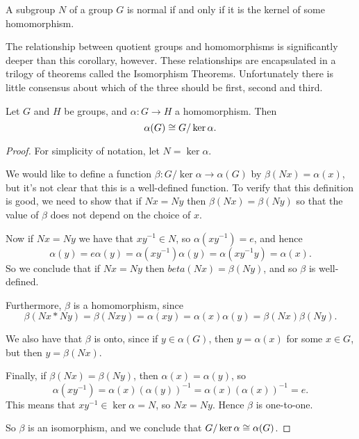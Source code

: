 \begin{corollary}
  A subgroup $N$ of a group $G$ is normal if and only if it is the 
  kernel of some homomorphism.
\end{corollary}

The relationship between quotient groups and homomorphisms is 
significantly deeper than this corollary, however.  These 
relationships are encapsulated in a trilogy of theorems called the 
Isomorphism Theorems.  Unfortunately there is little consensus about 
which of the three should be first, second and third.

\begin{theorem}
  Let $G$ and $H$ be groups, and $\alpha: G \to H$ a homomorphism.  
  Then
  \[
    \alpha(G) \cong G/\ker \alpha.
  \]
\end{theorem}
\begin{proof}
  For simplicity of notation, let $N = \ker \alpha$.
  
  We would like to define a function $\beta : G/\ker \alpha \to
  \alpha(G)$ by $\beta(Nx) = \alpha(x)$, but it's not clear that this 
  is a well-defined function.  To verify that this definition is 
  good, we need to show that if $Nx = Ny$ then $\beta(Nx) = 
  \beta(Ny)$ so that the value of $\beta$ does not depend on the choice 
  of $x$.
  
  Now if $Nx = Ny$ we have that $xy^{-1} \in N$, so $\alpha(xy^{-1}) = 
  e$, and hence
  \[
    \alpha(y) = e\alpha(y) = \alpha(xy^{-1})\alpha(y) = 
    \alpha(xy^{-1}y) = \alpha(x).
  \]
  So we conclude that if $Nx = Ny$ then $beta(Nx) = \beta(Ny)$, and 
  so $\beta$ is well-defined.
  
  Furthermore, $\beta$ is a homomorphism, since
  \[
    \beta(Nx \ast Ny) = \beta(Nxy) = \alpha(xy) = 
    \alpha(x)\alpha(y) = \beta(Nx)\beta(Ny).
  \]
  
  We also have that $\beta$ is onto, since if $y \in \alpha(G)$, then 
  $y = \alpha(x)$ for some $x \in G$, but then $y = \beta(Nx)$.
  
  Finally, if $\beta(Nx) = \beta(Ny)$, then $\alpha(x) = \alpha(y)$, so
  \[
    \alpha(xy^{-1}) = \alpha(x)(\alpha(y))^{-1} = 
    \alpha(x)(\alpha(x))^{-1} = e.
  \]
  This means that $xy^{-1} \in \ker \alpha = N$, so $Nx = Ny$.  
  Hence $\beta$ is one-to-one.
  
  So $\beta$ is an isomorphism, and we conclude that $G/\ker \alpha 
  \cong \alpha(G)$.
\end{proof}

